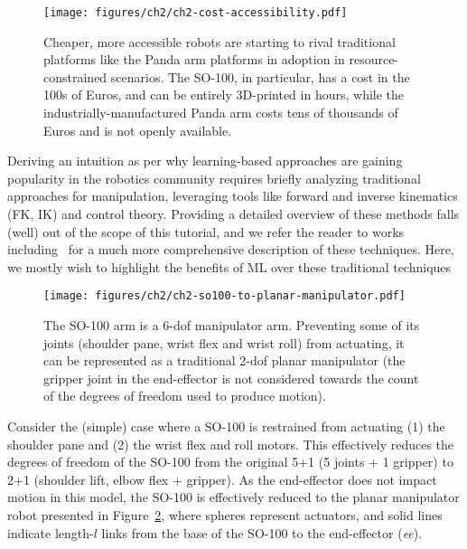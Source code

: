 \begin{figure}
    \centering
    \texttt{[image: figures/ch2/ch2-cost-accessibility.pdf]}
    \caption{Cheaper, more accessible robots are starting to rival traditional platforms like the Panda arm platforms in adoption in resource-constrained scenarios. The SO-100, in particular, has a cost in the 100s of Euros, and can be entirely 3D-printed in hours, while the industrially-manufactured Panda arm costs tens of thousands of Euros and is not openly available.}
    \label{fig:robotic-platforms-costs}
\end{figure}

Deriving an intuition as per why learning-based approaches are gaining popularity in the robotics community requires briefly analyzing traditional approaches for manipulation, leveraging tools like forward and inverse kinematics (FK, IK) and control theory.
Providing a detailed overview of these methods falls (well) out of the scope of this tutorial, and we refer the reader to works including~\citet{sicilianoSpringerHandbookRobotics2016, lynchModernRoboticsMechanics2017, tedrakeRoboticManipulationPerception, tedrakeUnderactuatedRoboticsAlgorithms} for a much more comprehensive description of these techniques.
Here, we mostly wish to highlight the benefits of ML over these traditional techniques

\begin{figure}
    \centering
    \texttt{[image: figures/ch2/ch2-so100-to-planar-manipulator.pdf]}
    \caption{The SO-100 arm is a 6-dof manipulator arm. Preventing some of its joints (shoulder pane, wrist flex and wrist roll) from actuating, it can be represented as a traditional 2-dof planar manipulator (the gripper joint in the end-effector is not considered towards the count of the degrees of freedom used to produce motion).}
    \label{fig:make-so100-planar-manipulator}
\end{figure}

Consider the (simple) case where a SO-100 is restrained from actuating (1) the shoulder pane and (2) the wrist flex and roll motors.
This effectively reduces the degrees of freedom of the SO-100 from the original 5+1 (5 joints + 1 gripper) to 2+1 (shoulder lift, elbow flex + gripper).
As the end-effector does not impact motion in this model, the SO-100 is effectively reduced to the planar manipulator robot presented in Figure~\ref{fig:make-so100-planar-manipulator}, where spheres represent actuators, and solid lines indicate length-\(l\) links from the base of the SO-100 to the end-effector (\emph{ee}).


